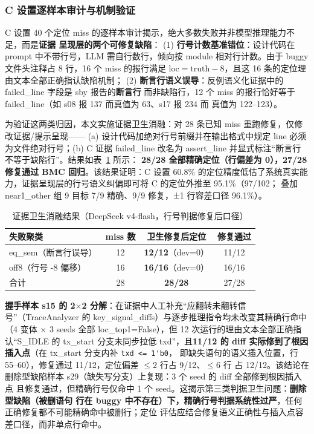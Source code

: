 \documentclass[twocolumn,10pt]{ctexart}
\begin{document}
\subsubsection{C 设置逐样本审计与机制验证}

C 设置 40 个定位 miss 的逐样本审计揭示，绝大多数失败并非模型推理能力不足，而是\textbf{证据
呈现层的两个可修复缺陷}：
(1) \textbf{行号计数基准错位}：设计代码在 prompt 中不带行号，LLM 需自行数行，倾向按 module
相对行计数。由于 buggy 文件头注释占 8 行，16 个 miss 的报行满足 $\mathrm{loc} = \mathrm{truth}
- 8$，且这 16 条的定位理由文本全部正确指认缺陷机制；
(2) \textbf{断言行语义误导}：反例语义化证据中的 failed\_line 字段是 sby 报告的\textbf{断言行}
而非缺陷行，12 个 miss 的报行恰好等于 failed\_line（如 s08 报 137 而真值为 63、s17 报 234 而
真值为 122--123）。

为验证这两类归因，本文实施证据卫生消融：对 28 条已知 miss 重跑修复，仅修改证据/提示呈现——
(a) 设计代码加绝对行号前缀并在输出格式中规定 line 必须为文件绝对行号；(b) C 证据 failed\_line
改名为 assert\_line 并显式标注“断言行不等于缺陷行”。结果如表~\ref{tab:hygiene_detail} 所示：
\textbf{28/28 全部精确定位（行偏差为 0），27/28 修复通过 BMC 回归}。该结果证明：C 设置 60.8\%
的定位精度低估了系统真实能力，证据呈现层的行号语义纠偏即可将 C 的定位外推至 95.1\%（97/102；
叠加 near1\_other 组 9 目标 7/9 精确、9/9 修复，±1 行容差口径 96.1\%）。

\begin{table}[t]
\centering
\caption{证据卫生消融结果（DeepSeek v4-flash，行号判据修复后口径）}
\label{tab:hygiene_detail}
\scriptsize
\renewcommand{\arraystretch}{1.12}
\begin{tabular}{lccc}
\toprule
失败聚类 & miss 数 & 卫生修复后定位 & 修复通过 \\
\midrule
eq\_sem（断言行误导） & 12 & \textbf{12/12}（dev=0） & 11/12 \\
off8（行号 -8 偏移） & 16 & \textbf{16/16}（dev=0） & 16/16 \\
\midrule
合计 & 28 & \textbf{28/28} & 27/28 \\
\bottomrule
\end{tabular}
\end{table}

\textbf{握手样本 s15 的 2$\times$2 分解}：在证据中人工补充“应翻转未翻转信号”（TraceAnalyzer
的 key\_signal\_diffs）与逐步推理指令均未改变其精确行命中（4 变体 $\times$ 3 seeds 全部
loc\_top1=False），但 12 次运行的理由文本全部正确指认“S\_IDLE 的 tx\_start 分支未同步拉低
txd”，且\textbf{11/12 的 diff 实际修到了根因插入点}（在 tx\_start 分支内补 \verb|txd <= 1'b0|，
即缺失语句的语义插入位置，行 55--60），修复通过 11/12，定位偏差 $\le 2$ 行占 9/12、$\le 6$ 行
占 12/12。该结论在删除型缺陷样本 s29（缺失写分支）上复现：3 个 seed 的 diff 全部修到根因插入点
且修复通过，但精确行号仅命中 1 个 seed。这揭示第三类判据卫生问题：\textbf{删除型缺陷（被删语句
行在 buggy 中不存在）下，精确行号判据系统性过严}，任何正确修复都不可能精确命中被删行；定位
评估应结合修复语义正确性与插入点容差口径，而非单点行命中。
\end{document}
